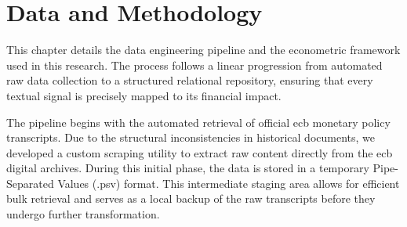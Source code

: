 \chapter{Data and Methodology}
This chapter details the data engineering pipeline and the econometric framework used in this research. The process follows a linear progression from automated raw data collection to a structured relational repository, ensuring that every textual signal is precisely mapped to its financial impact.

The pipeline begins with the automated retrieval of official \gls{ecb} monetary policy transcripts. Due to the structural inconsistencies in historical documents, we developed a custom scraping utility to extract raw content directly from the \gls{ecb} digital archives. During this initial phase, the data is stored in a temporary Pipe-Separated Values (.psv) format. This intermediate staging area allows for efficient bulk retrieval and serves as a local backup of the raw transcripts before they undergo further transformation.